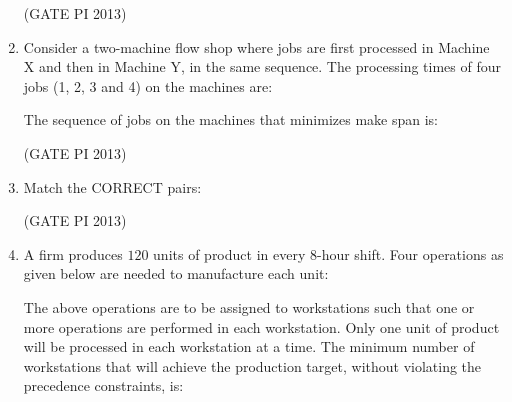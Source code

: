 \documentclass[journal,12pt,onecolumn]{IEEEtran}
\theoremstyle{remark}
\begin{document}
\begin{enumerate}
\hfill (GATE PI 2013)

\item Consider a two\--machine flow shop where jobs are first processed in Machine X and then in Machine Y, in the same sequence.  
The processing times of four jobs (1, 2, 3 and 4) on the machines are:   

The sequence of jobs on the machines that minimizes make span is:
\begin{enumerate}
\end{enumerate}

\hfill (GATE PI 2013)


\item Match the CORRECT pairs:  
 

\begin{enumerate}
\end{enumerate}

\hfill (GATE PI 2013)

\item A firm produces $120$ units of product in every $8$\--hour shift. Four operations as given below are needed to manufacture each unit: 

 

The above operations are to be assigned to workstations such that one or more operations are performed in each workstation.  
Only one unit of product will be processed in each workstation at a time.  
The minimum number of workstations that will achieve the production target, without violating the precedence constraints, is:
\begin{enumerate}
\end{enumerate}


\end{enumerate}
\end{document}
